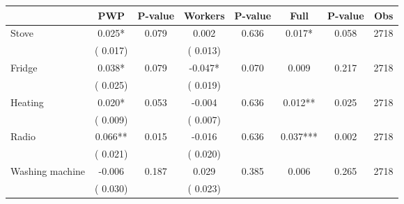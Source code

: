 
\begin{tabular}{l*{7}{c}}\hline&\multicolumn{1}{c}{PWP}&\multicolumn{1}{c}{P-value}&\multicolumn{1}{c}{Workers}&\multicolumn{1}{c}{P-value}&\multicolumn{1}{c}{Full}&\multicolumn{1}{c}{P-value}&\multicolumn{1}{c}{Obs} \\ \hline

 Stove       &              0.025*       &        0.079  &              0.002       &        0.636  &              0.017*       &              0.058 &  2718 \\ 
                       &       (       0.017)             &                               &       (       0.013)                     &                               &                                               &                                &                      \\ 

 Fridge       &              0.038*       &        0.079  &             -0.047*       &        0.070  &              0.009       &              0.217 &  2718 \\ 
                       &       (       0.025)             &                               &       (       0.019)                     &                               &                                               &                                &                      \\ 

 Heating       &              0.020*       &        0.053  &             -0.004       &        0.636  &              0.012**       &              0.025 &  2718 \\ 
                       &       (       0.009)             &                               &       (       0.007)                     &                               &                                               &                                &                      \\ 

 Radio       &              0.066**       &        0.015  &             -0.016       &        0.636  &              0.037***       &              0.002 &  2718 \\ 
                       &       (       0.021)             &                               &       (       0.020)                     &                               &                                               &                                &                      \\ 

 Washing machine       &             -0.006       &        0.187  &              0.029       &        0.385  &              0.006       &              0.265 &  2718 \\ 
                       &       (       0.030)             &                               &       (       0.023)                     &                               &                                               &                                &                      \\ 


\end{tabular}
